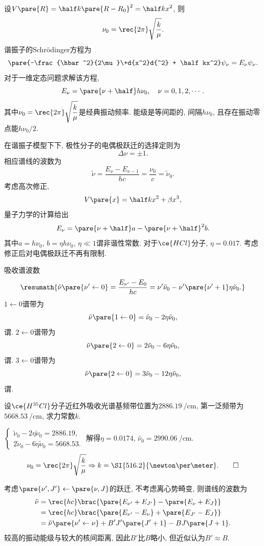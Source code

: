\documentclass[hidelinks]{ctexart}
\begin{document}
设$\displaystyle V\pare{R} = \half k\pare{R-R_0}^2 = \half kx^2$, 则
\[ \nu_0 = \rec{2\pi}\sqrt{\frac{k}{\mu}}. \]
谐振子的Schr\"odinger方程为
\[ \pare{-\frac{\hbar^2}{2\mu}\+d{x^2}d{^2} + \half kx^2}\psi_\nu = E_\nu \psi_\nu. \]
对于一维定态问题求解该方程,
\[ E_\nu = \pare{\nu + \half} h\nu_0,\quad \nu = 0,1,2,\cdots. \]
其中$\displaystyle \nu_0 = \rec{2\pi} \sqrt{\frac{k}{\mu}}$是经典振动频率. 能级是等间距的, 间隔$h\nu_0$, 且存在振动零点能$h\nu_0/2$.
\par
在谐振子模型下下, 极性分子的电偶极跃迁的选择定则为
\[ \Delta \nu = \pm 1. \]
相应谱线的波数为
\[ \tilde{\nu} = \frac{E_\nu - E_{\nu - 1}}{hc} = \frac{\nu_0}{c} = \tilde{\nu}_0. \]
考虑高次修正,
\[ V\pare{x} = \half kx^2 + \beta x^3, \]
量子力学的计算给出
\[ E_\nu = \pare{\nu + \half} a - \pare{\nu + \half}^2 b. \]
其中$a = h\nu_0$, $b = \eta h\nu_0$, $\eta \ll 1$谓非谐性常数. 对于$\ce{HCl}$分子, $\eta = 0.017$. 考虑修正后对电偶极跃迁不再有限制.
\par
吸收谱波数
\[ \resumath{\tilde{\nu}\pare{\nu' \leftarrow 0} = \frac{E_{\nu'} - E_0}{hc} = \nu'\tilde{\nu}_0 - \nu'\pare{\nu' + 1}\eta \tilde{\nu}_0.} \]
$1\leftarrow 0$谱带为
\[ \tilde{\nu}\pare{1\leftarrow 0} = \tilde{\nu}_0 - 2\eta\tilde{\nu}_0, \]
谓. $2\leftarrow 0$谱带为
\[ \tilde{\nu}\pare{2\leftarrow 0} = 2\tilde{\nu}_0 - 6\eta\tilde{\nu}_0, \]
谓. $3\leftarrow 0$谱带为
\[ \tilde{\nu}\pare{2\leftarrow 0} = 3\tilde{\nu}_0 - 12\eta\tilde{\nu}_0, \]
谓.
\begin{sample}
    \begin{ex}
        设$\ce{H{^{35}Cl}}$分子近红外吸收光谱基频带位置为$\SI{2886.19}{\per\centi\meter}$, 第一泛频带为$\SI{5668.53}{\per\centi\meter}$, 求力常数$k$.
    \end{ex}
    \begin{solution}
        $\displaystyle \begin{cases}
            \tilde{\nu}_0 - 2\eta\tilde{\nu}_0 = 2886.19, \\
            2\tilde{\nu}_0 - 6\eta\tilde{\nu}_0 = 5668.53.
        \end{cases}$ 解得$\eta = 0.0174$, $\tilde{\nu_0} = \SI{2990.06}{\per\centi\meter}$.
        \[ \nu_0 = \rec{2\pi}\sqrt{\frac{k}{\mu}} \Rightarrow k = \SI{516.2}{\newton\per\meter}. \qedhere \]
    \end{solution}
\end{sample}
考虑$\pare{\nu',J'} \leftarrow \pare{\nu,J}$的跃迁, 不考虑离心势畸变, 则谱线的波数为
\begin{align*}
    \tilde{\nu} &= \rec{hc}\brac{\pare{E_{\nu'} + E_{J'}} - \pare{E_\nu + E_J}} \\
    &= \rec{hc}\brac{\pare{E_{\nu'} - E_\nu} + \pare{E_{J'} - E_J}} \\
    &= \tilde{\nu}\pare{\nu' \leftarrow \nu} + B'J'\pare{J'+1} - BJ\pare{J+1}.
\end{align*}
较高的振动能级与较大的核间距离, 因此$B'$比$B$略小, 但近似认为$B' \approx B$.
\end{document}
